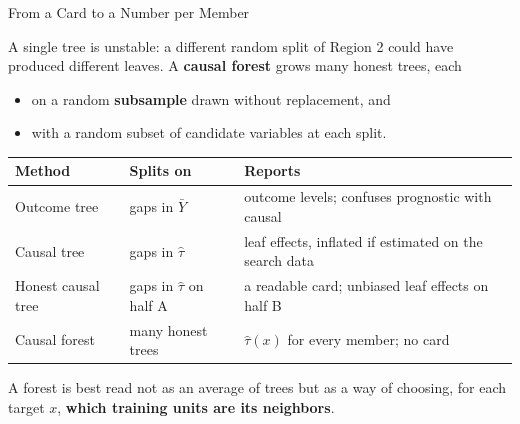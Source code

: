 \documentclass[aspectratio=169, 11pt, handout]{beamer}
\newcommand{\hatt}{\hat{\tau}}
\begin{document}
\begin{frame}{From a Card to a Number per Member}

A single tree is unstable: a different random split of Region 2 could have produced different leaves. A \textbf{causal forest} grows many honest trees, each
\begin{itemize}
  \item on a random \textbf{subsample} drawn without replacement, and
  \item with a random subset of candidate variables at each split.
\end{itemize}

\bigskip

\begin{center}
\small
\begin{tabular}{p{2.9cm}p{4.1cm}p{5.4cm}}
\toprule
\textbf{Method} & \textbf{Splits on} & \textbf{Reports} \\
\midrule
Outcome tree & gaps in $\bar Y$ & outcome levels; confuses prognostic with causal \\[0.2em]
Causal tree & gaps in $\hatt$ & leaf effects, inflated if estimated on the search data \\[0.2em]
Honest causal tree & gaps in $\hatt$ on half A & a readable card; unbiased leaf effects on half B \\[0.2em]
Causal forest & many honest trees & $\hatt(x)$ for every member; no card \\
\bottomrule
\end{tabular}
\end{center}

\medskip

A forest is best read not as an average of trees but as a way of choosing, for each target $x$, \textbf{which training units are its neighbors}.
\end{frame}
\end{document}
